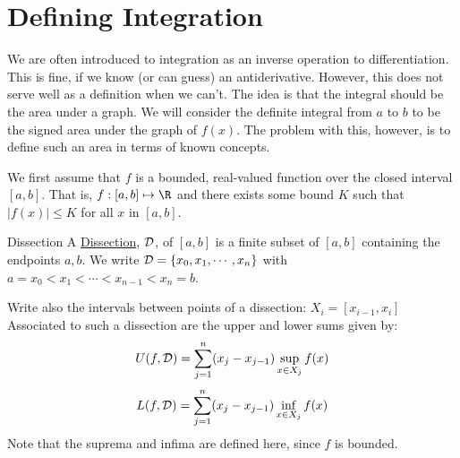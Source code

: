\documentclass[../Main.tex]{subfiles}
\begin{document}
\section{Defining Integration}
We are often introduced to integration as an inverse operation to differentiation. This is fine, if we know (or can guess) an antiderivative. However, this does not serve well as a definition when we can't. The idea is that the integral should be the area under a graph. We will consider the definite integral from $a$ to $b$ to be the signed area under the graph of $f(x)$. The problem with this, however, is to define such an area in terms of known concepts.\par
We first assume that $f$ is a bounded, real-valued function over the closed interval $[a, b]$. That is,
$f : [a, b] \mapsto \R$ and there exists some bound $K$ such that $|f(x)| \leq K$ for all $x$ in $[a, b]$.
\begin{definition}{Dissection}
    A \underline{Dissection}, $\mathcal{D}$, of $[a, b]$ is a finite subset of $[a, b]$ containing the endpoints $a, b$. We write $\mathcal{D} = \{x_0, x_1, \cdots, x_n\}$ with $a = x_0 < x_1 < \cdots < x_{n-1} < x_n = b$.
\end{definition}
Write also the intervals between points of a dissection: $X_i = [x_{i - 1}, x_i]$
Associated to such a dissection are the upper and lower sums given by:
\begin{equation}
    U(f, \mathcal{D}) = \sum_{j = 1}^n (x_j - x_{j - 1}) \sup_{x \in X_j} f(x)
    \label{eqnUpperSum}
\end{equation}
\begin{equation}
    L(f, \mathcal{D}) = \sum_{j = 1}^n (x_j - x_{j - 1}) \inf_{x \in X_j} f(x)
    \label{eqnLowerSum}
\end{equation}
Note that the suprema and infima are defined here, since $f$ is bounded.
\end{document}
